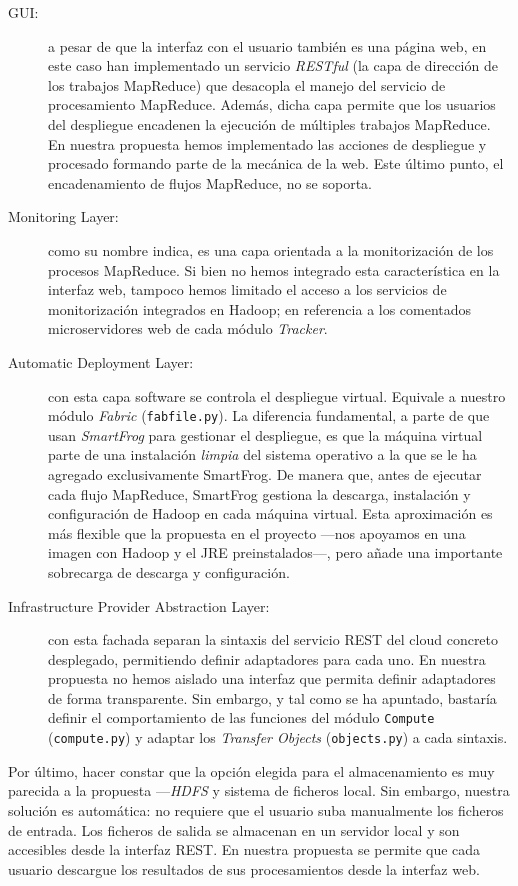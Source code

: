 \begin{description}
\item[GUI:] a pesar de que la interfaz con el usuario tambi\'en es una p\'agina web, en este caso han implementado un servicio \emph{RESTful} (la capa de direcci\'on de los trabajos MapReduce) que desacopla el manejo del servicio de procesamiento MapReduce. Adem\'as, dicha capa permite que los usuarios del despliegue encadenen la ejecuci\'on de m\'ultiples trabajos MapReduce. En nuestra propuesta hemos implementado las acciones de despliegue y procesado formando parte de la mec\'anica de la web. Este \'ultimo punto, el encadenamiento de flujos MapReduce, no se soporta.
\item[Monitoring Layer:] como su nombre indica, es una capa orientada a la monitorizaci\'on de los procesos MapReduce. Si bien no hemos integrado esta caracter\'istica en la interfaz web, tampoco hemos limitado el acceso a los servicios de monitorizaci\'on integrados en Hadoop; en referencia a los comentados microservidores web de cada m\'odulo \emph{Tracker}.
\item[Automatic Deployment Layer:] con esta capa software se controla el des\-plie\-gue virtual. Equivale a nuestro m\'odulo \emph{Fabric} (\texttt{fabfile.py}). La diferencia fundamental, a parte de que usan \emph{SmartFrog} para gestionar el despliegue, es que la m\'aquina virtual parte de una instalaci\'on \emph{limpia} del sistema operativo a la que se le ha agregado exclusivamente  SmartFrog. De manera que, antes de ejecutar cada flujo MapReduce, SmartFrog gestiona la descarga, instalaci\'on y configuraci\'on de Hadoop en cada m\'aquina virtual. Esta aproximaci\'on es m\'as flexible que la propuesta en el proyecto ---nos apoyamos en una imagen con Hadoop y el JRE preinstalados---, pero a\~nade una importante sobrecarga de descarga y configuraci\'on.
\item[Infrastructure Provider Abstraction Layer:] con esta fachada separan la sintaxis del servicio REST del cloud concreto desplegado, permitiendo definir adaptadores para cada uno. En nuestra propuesta no hemos aislado una interfaz que permita definir adaptadores de forma transparente. Sin embargo, y tal como se ha apuntado, bastar\'ia definir el comportamiento de las funciones del m\'odulo \texttt{Compute} (\texttt{compute.py}) y adaptar los \emph{Transfer Objects} (\texttt{objects.py}) a cada sintaxis.
\end{description}

Por \'ultimo, hacer constar que la opci\'on elegida para el almacenamiento es muy parecida a la propuesta ---\emph{HDFS} y sistema de ficheros local. Sin embargo, nuestra soluci\'on es autom\'atica: no requiere que el usuario suba manualmente los ficheros de entrada. Los ficheros de salida se almacenan en un servidor local y son accesibles desde la interfaz REST. En nuestra propuesta se permite que cada usuario descargue los resultados de sus procesamientos desde la interfaz web.

